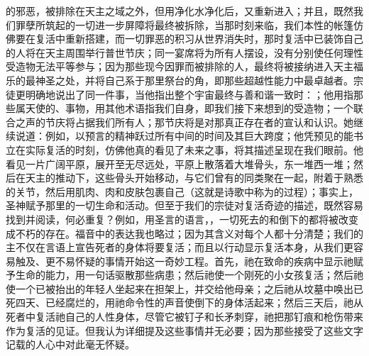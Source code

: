 的邪恶，被排除在天主之域之外，但用净化水净化后，又重新进入；并且，既然我们罪孽所筑起的一切进一步屏障将最终被拆除，当那时刻来临，我们本性的帐篷仿佛要在复活中重新搭建，而一切罪恶的积习从世界消失时，那时复活中已装饰自己的人将在天主周围举行普世节庆；同一宴席将为所有人摆设，没有分别使任何理性受造物无法平等参与；因为那些现今因罪而被排除的人，最终将被接纳进入天主福乐的最神圣之处，并将自己系于那里祭台的角，即那些超越性能力中最卓越者。\newline{}宗徒更明确地说出了同一件事，当他指出整个宇宙最终与善和谐一致时：；他用指那些属天使的、事物，用其他术语指我们自身，即我们接下来想到的受造物；一个联合之声的节庆将占据我们所有人；那节庆将是对那真正存在者的宣认和认识。\newline{}她继续说道：\newline{}例如，以预言的精神跃过所有中间的时间及其巨大跨度；他凭预见的能书立在实际复活的时刻，仿佛他真的看见了未来之事，将其描述呈现在我们眼前。\newline{}他看见一片广阔平原，展开至无尽远处，平原上散落着大堆骨头，东一堆西一堆；然后在天主的推动下，这些骨头开始移动，与它们曾有的同类聚在一起，附着于熟悉的关节，然后用肌肉、肉和皮肤包裹自己（这就是诗歌中称为的过程）；事实上，圣神赋予那里的一切生命和活动。\newline{}但至于我们的宗徒对复活奇迹的描述，既然容易找到并阅读，何必重复？例如，用圣言的语言，，一切死去的和倒下的都将被改变成不朽的存在。\newline{}福音中的表达我也略过；因为其含义对每个人都十分清楚；我们的主不仅在言语上宣告死者的身体将要复活；而且以行动显示复活本身，从我们更容易触及、更不易怀疑的事情开始这一奇妙工程。\newline{}首先，祂在致命的疾病中显示祂赋予生命的能力，用一句话驱散那些病患；然后祂使一个刚死的小女孩复活；然后祂使一个已被抬出的年轻人坐起来在担架上，并交给他母亲；之后祂从坟墓中唤出已死四天、已经腐烂的，用祂命令性的声音使倒下的身体活起来；然后三天后，祂从死者中复活祂自己的人性身体，尽管它被钉子和长矛刺穿，祂把那钉痕和枪伤带来作为复活的见证。\newline{}但我认为详细提及这些事情并无必要；因为那些接受了这些文字记载的人心中对此毫无怀疑。\par

